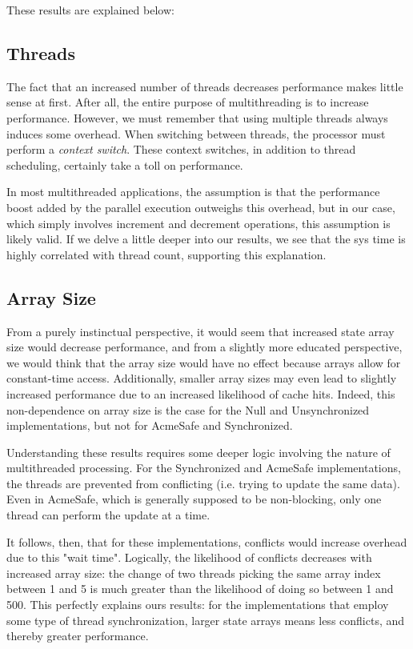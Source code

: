 \noindent These results are explained below:

\subsection{Threads}

The fact that an increased number of threads decreases performance makes little sense at first. After all, the entire purpose of 
multithreading is to increase performance. However, we must remember that using multiple threads always induces some overhead. 
When switching between threads, the processor must perform a \emph{context switch}. These context switches, in addition to thread scheduling, certainly 
take a toll on performance. 

In most multithreaded applications, the assumption is that the performance boost added by the parallel execution outweighs
this overhead, but in our case, which simply involves increment and decrement operations, this assumption is likely valid. If we delve a little deeper into our results, 
we see that the sys time is highly correlated with thread count, supporting this explanation. 
\subsection{Array Size}

From a purely instinctual perspective, it would seem that increased state array size would decrease performance, and from a slightly more 
educated perspective, we would think that the array size would have no effect because arrays allow for constant-time access. Additionally, 
smaller array sizes may even lead to slightly increased performance due to an increased likelihood of cache hits. Indeed, this non-dependence 
on array size is the case for the Null and Unsynchronized implementations, but not for AcmeSafe and Synchronized.

Understanding these results requires some deeper logic involving the nature of multithreaded processing. For the Synchronized
and AcmeSafe implementations, the threads are prevented from conflicting (i.e. trying to update the same data). Even in AcmeSafe, 
which is generally supposed to be non-blocking, only one thread can perform the update at a time.

It follows, then, that for these implementations, conflicts would increase overhead due to this "wait time". Logically, the likelihood of conflicts decreases with increased array size: the change 
of two threads picking the same array index between 1 and 5 is much greater than the likelihood of doing so between 1 and 500. This perfectly 
explains ours results: for the implementations that employ some type of thread synchronization, larger state arrays means less conflicts, and thereby
greater performance. 

